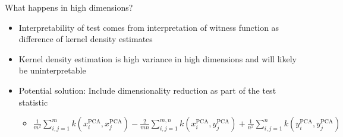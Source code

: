\begin{frame}{What happens in high dimensions?}
  \begin{itemize}
    \item Interpretability of test comes from interpretation of witness function as difference of kernel density estimates
    \vspace{\baselineskip}
    \pause
    \item Kernel density estimation is high variance in high dimensions and will likely be uninterpretable
    \vspace{\baselineskip}
    \pause
    \item Potential solution: Include dimensionality reduction as part of the test statistic
    \begin{itemize}
      \item $\frac{1}{m^2}\sum_{i,j=1}^{m}k(x_i^{\textrm{PCA}},x_j^{\textrm{PCA}}) - \frac{2}{mn}\sum_{i,j=1}^{m,n}k(x_i^{\textrm{PCA}},y_j^{\textrm{PCA}}) + \frac{1}{n^2}\sum_{i,j=1}^{n}k(y_i^{\textrm{PCA}},y_j^{\textrm{PCA}})$
    \end{itemize}
  \end{itemize}
\end{frame}

